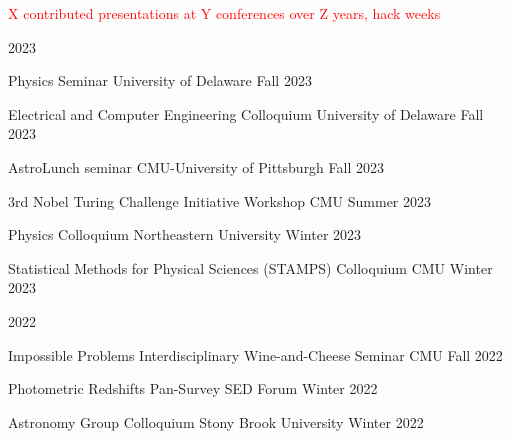 \documentclass[11pt,letterpaper]{article}
\begin{document}
{\fontsize{9pt}{5pt}\selectfont\textcolor{red}{X contributed  presentations at Y conferences over Z years, hack weeks}}
\nopagebreak\begin{list}{}{\malzlist}
	\item 2023
	\nopagebreak\begin{list}{}{\malzlist}
		\item {}
		{Physics Seminar}
		{University of Delaware}
		{Fall 2023}
		\item {}
		{Electrical and Computer Engineering Colloquium}
		{University of Delaware}
		{Fall 2023}
		\item {}
		{AstroLunch seminar}
		{CMU-University of Pittsburgh}
		{Fall 2023}
		\item {}
		{3rd Nobel Turing Challenge Initiative Workshop}
		{CMU}
		{Summer 2023}
		\item {}
		{Physics Colloquium}
		{Northeastern University}
		{Winter 2023}
		\item {}
		{Statistical Methods for Physical Sciences (STAMPS) Colloquium}
		{CMU}
		{Winter 2023}
	\end{list}
	\item 2022
	\nopagebreak\begin{list}{}{\malzlist}
		\item {}
		{Impossible Problems Interdisciplinary Wine-and-Cheese Seminar}
		{CMU}
		{Fall 2022}
		\item {}
		{Photometric Redshifts}
		{Pan-Survey SED Forum}
		{Winter 2022}
		\item {}
		{Astronomy Group Colloquium}
		{Stony Brook University}
		{Winter 2022}
		\item {}

\end{list}
\end{list}
\end{document}
